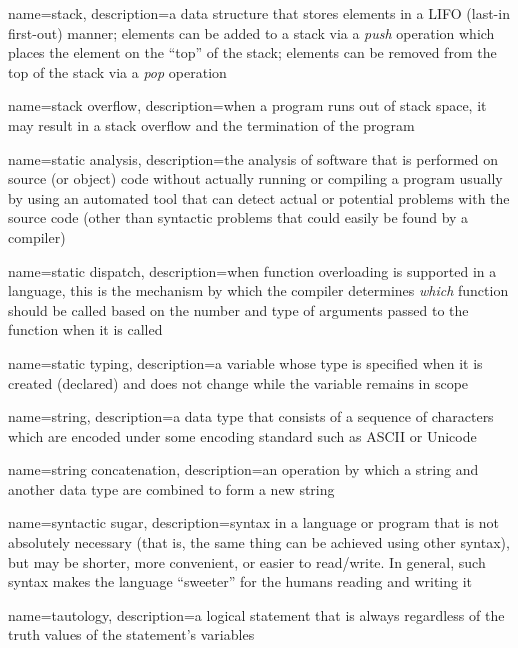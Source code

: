 {
  name=stack,
  description={a data structure that stores elements in a LIFO (last-in first-out) manner; elements can be added to a stack via a \emph{push} operation which places the element on the ``top'' of the stack; elements can be removed from the top of the stack via a \emph{pop} operation}
}

{
  name=stack overflow,
  description={when a program runs out of stack space, it may result in a stack overflow and the termination of the program}
}

{
  name=static analysis,
  description={the analysis of software that is performed on source (or object) code without actually running or compiling a program usually by using an automated tool that can detect actual or potential problems with the source code (other than syntactic problems that could easily be found by a compiler)}
}

{
  name=static dispatch,
  description={when function overloading is supported in a language, this is the mechanism by which the compiler determines \emph{which} function should be called based on the number and type of arguments passed to the function when it is called}
}

{
  name=static typing,
  description={a variable whose type is specified when it is created (declared) and does not change while the
  	variable remains in scope}
}

{
  name=string,
  description={a data type that consists of a sequence of characters which are encoded under some encoding standard such as ASCII or Unicode}
}

{
  name=string concatenation,
  description={an operation by which a string and another data type are combined to form a new string}
}

{
  name=syntactic sugar,
  description={syntax in a language or program that is not absolutely necessary (that is, the
  	same thing can be achieved using other syntax), but may be shorter, more convenient, or
	easier to read/write.  In general, such syntax makes the language ``sweeter'' for the
	humans reading and writing it}
}

{
  name=tautology,
  description={a logical statement that is always \True regardless of the truth values of the statement's variables}
}

